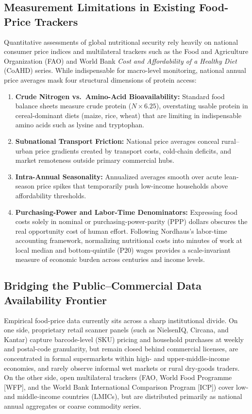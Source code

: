 \documentclass[11pt,a4paper]{article}
\begin{document}
\subsection{Measurement Limitations in Existing Food-Price Trackers}
Quantitative assessments of global nutritional security rely heavily on national consumer price indices and multilateral trackers such as the Food and Agriculture Organization (FAO) and World Bank \textit{Cost and Affordability of a Healthy Diet} (CoAHD) series. While indispensable for macro-level monitoring, national annual price averages mask four structural dimensions of protein access:
\begin{enumerate}
    \item \textbf{Crude Nitrogen vs.\ Amino-Acid Bioavailability:} Standard food balance sheets measure crude protein ($N \times 6.25$), overstating usable protein in cereal-dominant diets (maize, rice, wheat) that are limiting in indispensable amino acids such as lysine and tryptophan.
    \item \textbf{Subnational Transport Friction:} National price averages conceal rural--urban price gradients created by transport costs, cold-chain deficits, and market remoteness outside primary commercial hubs.
    \item \textbf{Intra-Annual Seasonality:} Annualized averages smooth over acute lean-season price spikes that temporarily push low-income households above affordability thresholds.
    \item \textbf{Purchasing-Power and Labor-Time Denominators:} Expressing food costs solely in nominal or purchasing-power-parity (PPP) dollars obscures the real opportunity cost of human effort. Following Nordhaus's labor-time accounting framework, normalizing nutritional costs into minutes of work at local median and bottom-quintile ($\text{P20}$) wages provides a scale-invariant measure of economic burden across centuries and income levels.
\end{enumerate}

\subsection{Bridging the Public--Commercial Data Availability Frontier}
Empirical food-price data currently sits across a sharp institutional divide. On one side, proprietary retail scanner panels (such as NielsenIQ, Circana, and Kantar) capture barcode-level (SKU) pricing and household purchases at weekly and postal-code granularity, but remain closed behind commercial licenses, are concentrated in formal supermarkets within high- and upper-middle-income economies, and rarely observe informal wet markets or rural dry-goods traders. On the other side, open multilateral trackers (FAO, World Food Programme [WFP], and the World Bank International Comparison Program [ICP]) cover low- and middle-income countries (LMICs), but are distributed primarily as national annual aggregates or coarse commodity series.
\end{document}
